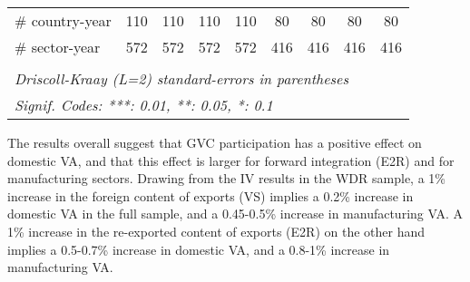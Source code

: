 \documentclass[a4paper]{article}
\begin{document}
\begin{table}[h!]
{\begin{tabular}{lcccccccc}
      \# country-year         & 110            & 110                   & 110                   & 110                   & 80       & 80                    & 80                    & 80\\  
      \# sector-year          & 572            & 572                   & 572                   & 572                   & 416      & 416                   & 416                   & 416\\  
      \bottomrule \\ [-0.9em]
      \multicolumn{9}{l}{\emph{Driscoll-Kraay (L=2) standard-errors in parentheses}}\\
      \multicolumn{9}{l}{\emph{Signif. Codes: ***: 0.01, **: 0.05, *: 0.1}}\\
   \end{tabular}
   }
\end{table}
\FloatBarrier

The results overall suggest that GVC participation has a positive effect on domestic VA, and that this effect is larger for forward integration (E2R) and for manufacturing sectors. Drawing from the IV results in the WDR sample, a 1\% increase in the foreign content of exports (VS) implies a 0.2\% increase in domestic VA in the full sample, and a 0.45-0.5\% increase in manufacturing VA. A 1\% increase in the re-exported content of exports (E2R) on the other hand implies a 0.5-0.7\% increase in domestic VA, and a 0.8-1\% increase in manufacturing VA. 
\end{document}
